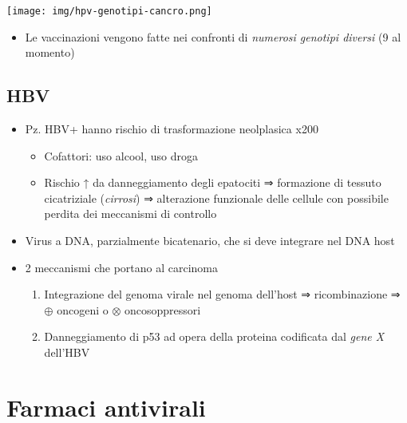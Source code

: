 \documentclass[italian,]{article}
\providecommand{\tightlist}{%
  \setlength{\itemsep}{0pt}\setlength{\parskip}{0pt}}
\newcommand{\att}[0]{ $\oplus$ }                                        %
\newcommand{\ini}[0]{ $\otimes$ }                                       %
\begin{document}
\texttt{[image: img/hpv-genotipi-cancro.png]}~

\begin{itemize}
\tightlist
\item
  Le vaccinazioni vengono fatte nei confronti di \emph{numerosi genotipi
  diversi} (9 al momento)
\end{itemize}

\hypertarget{hbv}{%
\subsection{HBV}\label{hbv}}

\begin{itemize}
\tightlist
\item
  Pz. HBV+ hanno rischio di trasformazione neolplasica x200

  \begin{itemize}
  \tightlist
  \item
    Cofattori: uso alcool, uso droga
  \item
    Rischio ↑ da danneggiamento degli epatociti ⇒ formazione di tessuto
    cicatriziale (\emph{cirrosi}) ⇒ alterazione funzionale delle cellule
    con possibile perdita dei meccanismi di controllo
  \end{itemize}
\item
  Virus a DNA, parzialmente bicatenario, che si deve integrare nel DNA
  host
\item
  2 meccanismi che portano al carcinoma

  \begin{enumerate}
  \def\labelenumi{\arabic{enumi}.}
  \tightlist
  \item
    Integrazione del genoma virale nel genoma dell'host ⇒ ricombinazione
    ⇒ \att oncogeni o \ini oncosoppressori
  \item
    Danneggiamento di p53 ad opera della proteina codificata dal
    \emph{gene X} dell'HBV
  \end{enumerate}
\end{itemize}

\hypertarget{farmaci-antivirali}{%
\section{Farmaci antivirali}\label{farmaci-antivirali}}
\end{document}
